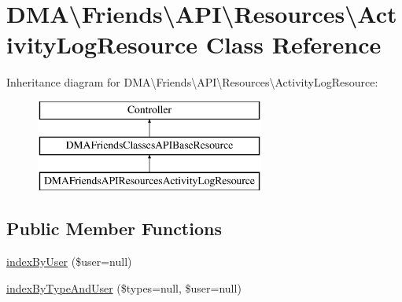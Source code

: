 \hypertarget{classDMA_1_1Friends_1_1API_1_1Resources_1_1ActivityLogResource}{}\section{D\+M\+A\textbackslash{}Friends\textbackslash{}A\+P\+I\textbackslash{}Resources\textbackslash{}Activity\+Log\+Resource Class Reference}
\label{classDMA_1_1Friends_1_1API_1_1Resources_1_1ActivityLogResource}
Inheritance diagram for D\+M\+A\textbackslash{}Friends\textbackslash{}A\+P\+I\textbackslash{}Resources\textbackslash{}Activity\+Log\+Resource\+:\begin{figure}[H]
\begin{center}
\leavevmode
\includegraphics[height=3.000000cm]{d3/d22/classDMA_1_1Friends_1_1API_1_1Resources_1_1ActivityLogResource}
\end{center}
\end{figure}
\subsection*{Public Member Functions}
\begin{DoxyCompactItemize}
\item 
\hyperlink{classDMA_1_1Friends_1_1API_1_1Resources_1_1ActivityLogResource_ab093e778e404042eac0e06e0d8148a49}{index\+By\+User} (\$user=null)
\item 
\hyperlink{classDMA_1_1Friends_1_1API_1_1Resources_1_1ActivityLogResource_a34b4b73d1baf95a90e7337e32385fe07}{index\+By\+Type\+And\+User} (\$types=null, \$user=null)
\end{DoxyCompactItemize}
